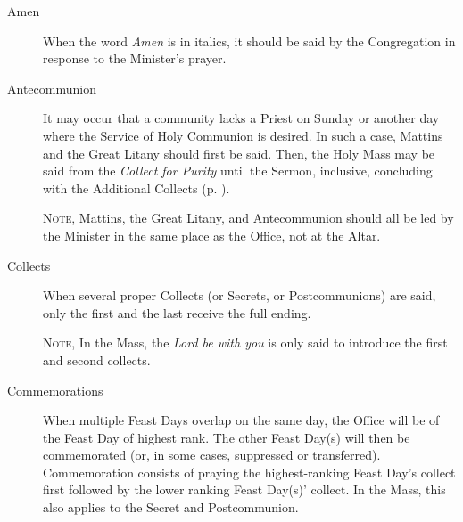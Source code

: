 \begin{description}
\item[Amen] When the word \emph{Amen} is in italics, it should be said by the Congregation in response to the Minister's prayer.
\item[Antecommunion] It may occur that a community lacks a Priest on Sunday or another day where the Service of Holy Communion is desired. In such a case, Mattins and the Great Litany should first be said. Then, the Holy Mass may be said from the \emph{Collect for Purity} until the Sermon, inclusive, concluding with the Additional Collects (p. \pageref{AdditionalCollects}).\par
\textsc{Note,} Mattins, the Great Litany, and Antecommunion should all be led by the Minister in the same place as the Office, not at the Altar.
\item[Collects] When several proper Collects (or Secrets, or Postcommunions) are said, only the first and the last receive the full ending.\par
	\textsc{Note,} In the Mass, the \emph{Lord be with you} is only said to introduce the first and second collects.
\item[Commemorations] When multiple Feast Days overlap on the same day, the Office will be of the Feast Day of highest rank. The other Feast Day(s) will then be commemorated (or, in some cases, suppressed or transferred). Commemoration consists of praying the highest-ranking Feast Day's collect first followed by the lower ranking Feast Day(s)' collect. In the Mass, this also applies to the Secret and Postcommunion.

\end{description}
